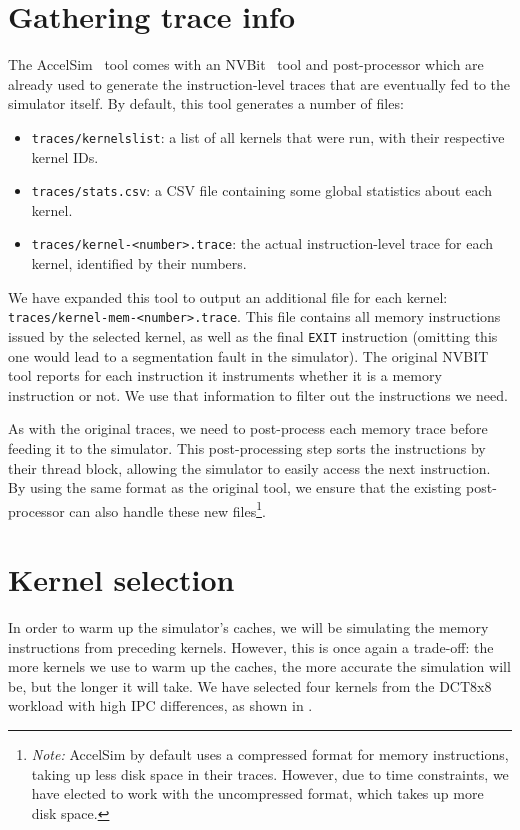 \section{Gathering trace info}\label{sec:trace-info}
The AccelSim~\cite{accelsim} tool comes with an NVBit~\cite{nvbit} tool and post-processor which are already used to generate the instruction-level traces that are eventually fed to the simulator itself.
By default, this tool generates a number of files:
\begin{itemize}
    \item \verb|traces/kernelslist|: a list of all kernels that were run, with their respective kernel IDs.
    \item \verb|traces/stats.csv|: a CSV file containing some global statistics about each kernel.
    \item \verb|traces/kernel-<number>.trace|: the actual instruction-level trace for each kernel, identified by their numbers.
\end{itemize}

We have expanded this tool to output an additional file for each kernel: \verb|traces/kernel-mem-<number>.trace|.
This file contains all memory instructions issued by the selected kernel, as well as the final \verb|EXIT| instruction (omitting this one would lead to a segmentation fault in the simulator).
The original NVBIT tool reports for each instruction it instruments whether it is a memory instruction or not.
We use that information to filter out the instructions we need.

As with the original traces, we need to post-process each memory trace before feeding it to the simulator.
This post-processing step sorts the instructions by their thread block, allowing the simulator to easily access the next instruction.
By using the same format as the original tool, we ensure that the existing post-processor can also handle these new files\footnote{
    \textit{Note:} AccelSim by default uses a compressed format for memory instructions, taking up less disk space in their traces.
    However, due to time constraints, we have elected to work with the uncompressed format, which takes up more disk space.
}.

\FloatBarrier
\section{Kernel selection}\label{sec:kernel-selection}
In order to warm up the simulator's caches, we will be simulating the memory instructions from preceding kernels.
However, this is once again a trade-off: the more kernels we use to warm up the caches, the more accurate the simulation will be, but the longer it will take.
We have selected four kernels from the DCT8x8 workload with high IPC differences, as shown in .


